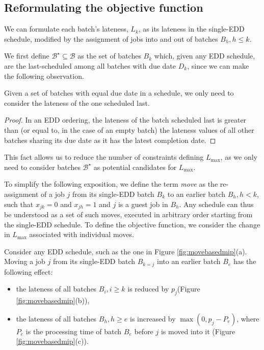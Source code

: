 \documentclass[oribibl]{llncs}
\def\Lmax{{L_{\mathrm{max}}}}
\begin{document}
\subsection{Reformulating the objective function}
\label{sec:moves}

We can formulate each batch's lateness, $L_k$, as its 
lateness in the single-EDD schedule, modified by the assignment of jobs into and
out of batches $B_h, h \leq k$. 

We first define $\mathcal{B}^\star \subseteq \mathcal{B}$ as the set of batches
$B_k$ which, given any EDD schedule, are the last-scheduled among all batches
with due date $D_k$, since we can make the following observation.
\begin{proposition}
Given a set of batches with equal due date in a schedule, we only need to 
consider the lateness of the one scheduled last.
\end{proposition}
\begin{proof}
  In an EDD ordering, the lateness of the batch scheduled last is greater
  than (or equal to, in the case of an empty batch) the lateness values
  of all other batches sharing its due date as it has the latest completion
  date.
\end{proof}
This fact allows us to reduce the number of constraints defining $\Lmax$, as
we only need to consider batches $\mathcal{B}^\star$ as potential candidates for
$\Lmax$.

To simplify the following exposition, we define the term
\textit{move} as the re-assignment of a job $j$ from its single-EDD
batch $B_k$ to an earlier batch $B_h, h < k$, such that $x_{jk}=0$ and $x_{jh}=1$ and $j$
is a guest job in $B_h$.
Any schedule can thus be understood as a set of such moves, executed in arbitrary
order starting from the single-EDD schedule. To define the objective function,
we consider the change in $\Lmax$ associated with individual moves.

Consider any EDD
schedule, such as the one in Figure \ref{fig:movebasedmip}(a). Moving
a job $j$ from its single-EDD batch $B_{k=j}$ into an earlier batch
$B_e$ has the following effect:

\begin{itemize}
\item the lateness of all batches $B_i, i \geq k$ is reduced by $p_j$(Figure \ref{fig:movebasedmip}(b)),
\item the lateness of all batches $B_h, h \geq e$ is increased by
$\max(0,p_j - P_e)$, where $P_e$ is the processing time of batch $B_e$
before $j$ is moved into it (Figure \ref{fig:movebasedmip}(c)).
\end{itemize}
\end{document}
